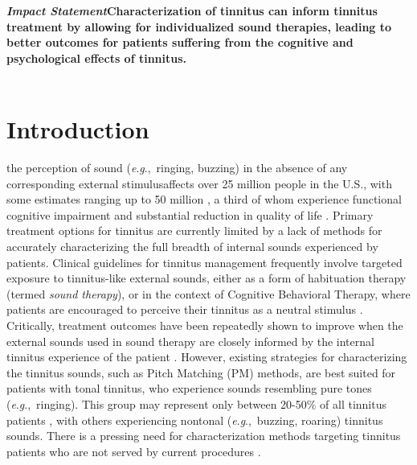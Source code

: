 \documentclass[journal]{IEEEtran}
\newcommand{\eg}{\textit{e}.\textit{g}.,\ }
\begin{document}
\begin{minipage}[t]{1\columnwidth}
  \textbf{\textit{Impact Statement}\textemdash{}Characterization of tinnitus can inform tinnitus treatment by allowing for individualized sound therapies, leading to better outcomes for patients suffering from the cognitive and psychological effects of tinnitus.}\\
\\
\end{minipage}

\section{Introduction}
\textemdash{}the perception of sound (\eg ringing, buzzing)
in the absence of any corresponding external stimulus\textemdash{}affects over 25 million people in the U.S., with some estimates ranging up to 50 million \cite{QuickStatisticsHearing,bhattPrevalenceSeverityExposures2016}, a third of whom experience functional cognitive impairment and substantial reduction in quality of life
\cite{ahmedImpactTinnitusPerception2017,nondahlImpactTinnitusQuality2007,tegg-quinnImpactTinnitusCognition2016}.
Primary treatment options for tinnitus are currently limited by a lack of methods for accurately characterizing the full breadth of internal sounds experienced by patients.
Clinical guidelines for tinnitus management frequently involve targeted exposure to tinnitus-like external sounds, either as a form of habituation therapy (termed \textit{sound therapy}), or in the context of Cognitive Behavioral Therapy, where patients are encouraged to perceive their tinnitus as a neutral stimulus \cite{tunkelClinicalPracticeGuideline2014}.
Critically, treatment outcomes have been repeatedly shown to improve when the external sounds used in sound therapy are closely informed by the internal tinnitus experience of the patient
\cite{davisNeuromonicsTinnitusTreatment2007,landgrebeMethodologicalAspectsClinical2012,nickelOutcomeResearchMusic2005,okamotoListeningTailormadeNotched2010,schaetteAcousticStimulationTreatments2010,steinInhibitioninducedPlasticityTinnitus2015,tassCounteractingTinnitusAcoustic2012,wangStateArtSound2020}.
However, existing strategies for characterizing the tinnitus sounds, such as Pitch Matching (PM) methods, are best suited for patients with tonal tinnitus, who experience sounds resembling pure tones (\eg ringing).
This group may represent only between 20-50\% of all tinnitus patients \cite{turnerjrAuditoryDysfunctionTinnitus1990,henryAuditoryTestResult2009,ukaegbeTinnitusItsEffect2017}, with others experiencing nontonal (\eg buzzing, roaring) tinnitus sounds.
There is a pressing need for characterization methods targeting tinnitus patients who are not served by current procedures
\cite{henryTinnitusEpidemiologicPerspective2020,henryMeasurementTinnitus2016,norenaPsychoacousticCharacterizationTinnitus2002,robertsResidualInhibitionFunctions2006}.
\end{document}
